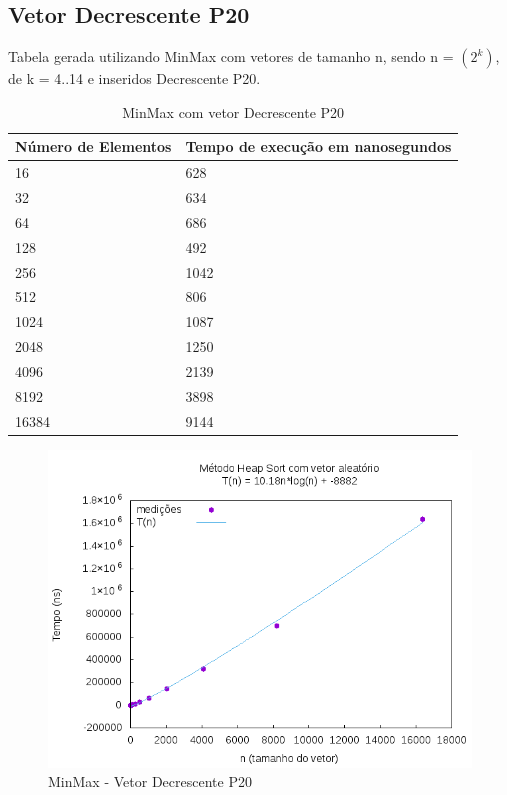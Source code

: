 \documentclass[12pt,a4paper,twoside]{report}
\begin{document}
\subsection{Vetor Decrescente P20}
Tabela gerada utilizando MinMax com vetores de tamanho n, sendo n = $(2^k)$, de k = 4..14 e inseridos Decrescente P20.
\begin{table}[H]
\centering
\caption{MinMax com vetor Decrescente P20}
\label{my-label}
\begin{tabular}{|l|l|}
\hline
\multicolumn{1}{|c|}{\textbf{Número de Elementos}} & \multicolumn{1}{c|}{\textbf{Tempo de execução em nanosegundos}} \\ \hline
16 & 628 \\ \hline
32 & 634 \\ \hline
64 & 686 \\ \hline
128 & 492 \\ \hline
256 & 1042 \\ \hline
512 & 806 \\ \hline
1024 & 1087 \\ \hline
2048 & 1250 \\ \hline
4096 & 2139 \\ \hline
8192 & 3898 \\ \hline
16384 & 9144 \\ \hline
\end{tabular}
\end{table}

\begin{figure}[H]
    \centering
    \includegraphics[width=0.7\linewidth]{graficos/HeapSort/vIntAleatorio/vIntAleatorio.png}
  \caption{MinMax - Vetor Decrescente P20}
\end{figure}
\end{document}
